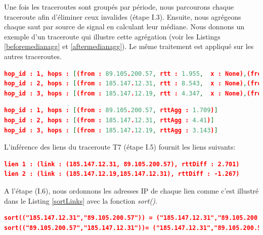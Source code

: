 Une fois les traceroutes sont groupés par période, nous parcourons chaque traceroute afin d'éliminer ceux invalides (étape  I.3). 
Ensuite, nous agrégeons chaque saut par source de signal en calculant leur médiane. Nous donnons un exemple d'un traceroute qui illustre cette agrégation (voir les Listings \ref{beforemedianagg} et \ref{aftermedianagg}). Le même traitement est appliqué sur les autres traceroutes. 

\begin{lstlisting}[language=json,firstnumber=1, caption={Les sauts du traceroute T7 (sans agrégation)}, basicstyle=\footnotesize, label=beforemedianagg]
hop_id : 1, hops : [(from : 89.105.200.57, rtt : 1.955,  x : None),(from : 89.105.200.57, rtt : 1.7, x : None),(from : 89.105.200.57, rtt : 1.709,  x : None)]
hop_id : 2, hops : [(from : 185.147.12.31, rtt : 8.543,  x : None),(from : 185.147.12.31, rtt : 4.103, x : None),(from : 185.147.12.31, rtt : 4.41, x : None)]
hop_id : 3, hops : [(from : 185.147.12.19, rtt : 4.347,  x : None),(from : 185.147.12.19, rtt : 2.876, x : None),(from : 185.147.12.19, rtt : 3.143, x : None )]
\end{lstlisting}

\begin{lstlisting}[language=json,firstnumber=1, caption={Les sauts du traceroute T7 (après l'agrégation)}, basicstyle=\footnotesize, label=aftermedianagg]
hop_id : 1, hops : [(from : 89.105.200.57, rttAgg : 1.709)]
hop_id : 2, hops : [(from : 185.147.12.31, rttAgg : 4.41)] 
hop_id : 3, hops : [(from : 185.147.12.19, rttAgg : 3.143)]
\end{lstlisting}

L'inférence  des liens du traceroute T7 (étape I.5) fournit les liens suivants: 

\begin{lstlisting}[language=json,firstnumber=1, caption={Exemple des liens inférés du traceroute T7}, basicstyle = \footnotesize]
lien 1 : (link : (185.147.12.31, 89.105.200.57), rttDiff : 2.701)
lien 2 : (link : (185.147.12.19,185.147.12.31), rttDiff : -1.267)
\end{lstlisting}


A l'étape (I.6), nous ordonnons les adresses IP de chaque lien  comme c'est illustré dans le Listing \ref{sortLinks} avec la fonction \textit{sort()}. 

\begin{lstlisting}[language=json,firstnumber=1, caption={Illustration de l'ordre des liens}, basicstyle = \footnotesize, label=sortLinks]
sort(("185.147.12.31","89.105.200.57")) = ("185.147.12.31","89.105.200.57")
sort(("89.105.200.57","185.147.12.31"))= ("185.147.12.31","89.105.200.57")   
\end{lstlisting}


